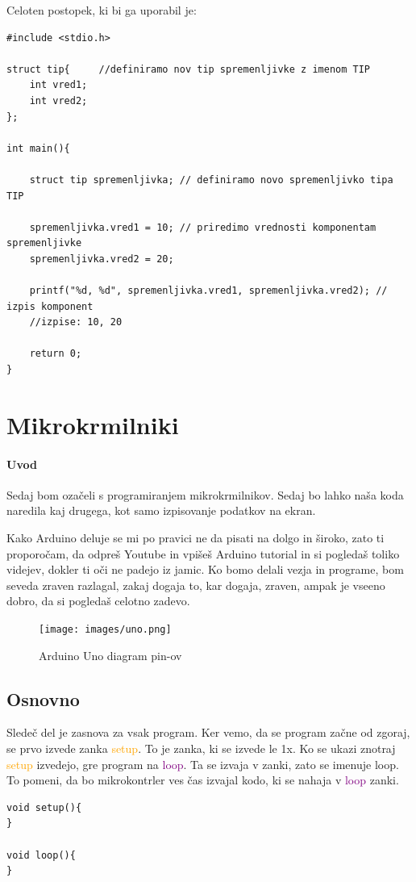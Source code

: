 \documentclass[a4paper, 12pt]{article}
\begin{document}
Celoten postopek, ki bi ga uporabil je:

\begin{lstlisting}
#include <stdio.h>

struct tip{ 	//definiramo nov tip spremenljivke z imenom TIP 
	int vred1;
	int vred2;
};

int main(){
	
	struct tip spremenljivka; // definiramo novo spremenljivko tipa TIP
	
	spremenljivka.vred1 = 10; // priredimo vrednosti komponentam spremenljivke
	spremenljivka.vred2 = 20;
	
	printf("%d, %d", spremenljivka.vred1, spremenljivka.vred2); // izpis komponent
	//izpise: 10, 20

	return 0;
}
\end{lstlisting}



\section{Mikrokrmilniki}

\paragraph{Uvod}Sedaj bom ozačeli s programiranjem mikrokrmilnikov. Sedaj bo lahko naša koda naredila kaj drugega, kot samo izpisovanje podatkov na ekran.\

Kako Arduino deluje se mi po pravici ne da pisati na dolgo in široko, zato ti proporočam, da odpreš Youtube in vpišeš Arduino tutorial in si pogledaš toliko videjev, dokler ti oči ne padejo iz jamic. Ko bomo delali vezja in programe, bom seveda zraven razlagal, zakaj dogaja to, kar dogaja, zraven, ampak je vseeno dobro, da si pogledaš celotno zadevo.\

\begin{figure}[!htbp]
	\centering
	\texttt{[image: images/uno.png]}
	\caption{Arduino Uno diagram pin-ov}
	\label{fig:Arduino Uno diagram pin-ov}
\end{figure}

\subsection{Osnovno}
Sledeč del je zasnova za vsak program. Ker vemo, da se program začne od zgoraj, se prvo izvede zanka \textcolor{orange}{setup}. To je zanka, ki se izvede le 1x. Ko se ukazi znotraj \textcolor{orange}{setup} izvedejo, gre program na \textcolor{purple}{loop}. Ta se izvaja v zanki, zato se imenuje loop. To pomeni, da bo mikrokontrler ves čas izvajal kodo, ki se nahaja v  \textcolor{purple}{loop} zanki.
\begin{lstlisting}
void setup(){
}

void loop(){
}
\end{lstlisting}
\end{document}
